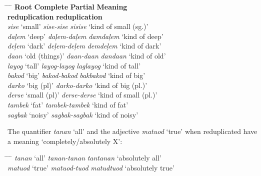 \newpage
\ea
\label{bkm:Ref423363798}\label{bkm:Ref481477458}
\begin{tabbing}
\hspace{3cm} \= \hspace{2.8cm} \= \hspace{2.5cm} \= \kill   
\textbf{Root} \> \textbf{Complete} \> \textbf{Partial} \>   \textbf{Meaning} \\
\>  \textbf{reduplication}     \> \textbf{reduplication} \\
\textit{sise}   ‘small'        \> \textit{sise-sise    } \> \textit{sisise  }                \> ‘kind of small (sg.)’ \\
\textit{daļem}  ‘deep’         \> \textit{daļem-daļem  } \> \textit{damdaļem}                \>  ‘kind of deep’ \\
\textit{deļem}  ‘dark’         \> \textit{deļem-deļem  } \> \textit{demdeļem}                \>  ‘kind of dark’ \\
\textit{daan}   ‘old (things)’ \> \textit{daan-daan    } \> \textit{dandaan }                \>  ‘kind of old’ \\
\textit{layog}  ‘tall’         \> \textit{layog-layog  } \> \textit{laglayog}                \>  ‘kind of tall’ \\
\textit{bakod}  ‘big’          \> \textit{bakod-bakod  } \> \textit{bakbakod}\footnotemark   \> ‘kind of big’ \\
\textit{darko}  ‘big (pl)’     \> \textit{darko-darko  } \>                                  \>  ‘kind of big (pl.)’ \\
\textit{derse}  ‘small (pl)’   \> \textit{derse-derse  } \>                                  \>  ‘kind of small (pl.)’ \\
\textit{tambek} ‘fat’          \> \textit{tambek-tambek} \>                                  \>  ‘kind of fat’ \\
\textit{sagbak} ‘noisy’        \> \textit{sagbak-sagbak} \>                                  \>  ‘kind of noisy’
\end{tabbing}
\z

The quantifier \textit{tanan} ‘all’ and the adjective \textit{matuod} ‘true’ when reduplicated have a  meaning ‘completely/absolutely X’:

\ea
\begin{tabbing}
\hspace{3cm} \= \hspace{2.8cm} \= \hspace{2.5cm} \= \kill   
\textit{tanan} ‘all' \>  \textit{tanan-tanan} \> \textit{tantanan}   \> ‘absolutely all’ \\
\textit{matuod} ‘true’ \> \textit{matuod-tuod} \> \textit{matudtuod}  \>  ‘absolutely true’
\end{tabbing}
\z

